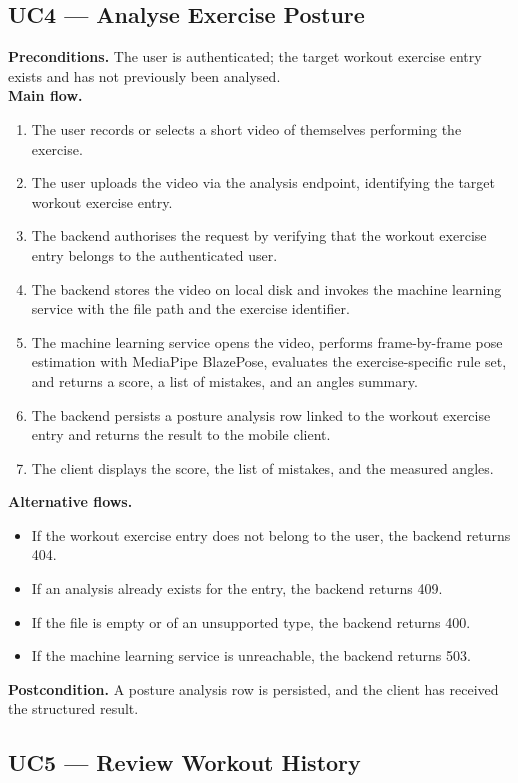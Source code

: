 \subsection{UC4 --- Analyse Exercise Posture}
\label{subsec:uc4}

\textbf{Preconditions.} The user is authenticated; the target workout exercise entry exists and has not previously been analysed.\\
\textbf{Main flow.}
\begin{enumerate}
    \item The user records or selects a short video of themselves performing the exercise.
    \item The user uploads the video via the analysis endpoint, identifying the target workout exercise entry.
    \item The backend authorises the request by verifying that the workout exercise entry belongs to the authenticated user.
    \item The backend stores the video on local disk and invokes the machine learning service with the file path and the exercise identifier.
    \item The machine learning service opens the video, performs frame-by-frame pose estimation with MediaPipe BlazePose, evaluates the exercise-specific rule set, and returns a score, a list of mistakes, and an angles summary.
    \item The backend persists a posture analysis row linked to the workout exercise entry and returns the result to the mobile client.
    \item The client displays the score, the list of mistakes, and the measured angles.
\end{enumerate}
\textbf{Alternative flows.}
\begin{itemize}
    \item If the workout exercise entry does not belong to the user, the backend returns 404.
    \item If an analysis already exists for the entry, the backend returns 409.
    \item If the file is empty or of an unsupported type, the backend returns 400.
    \item If the machine learning service is unreachable, the backend returns 503.
\end{itemize}
\textbf{Postcondition.} A posture analysis row is persisted, and the client has received the structured result.

\subsection{UC5 --- Review Workout History}
\label{subsec:uc5}

